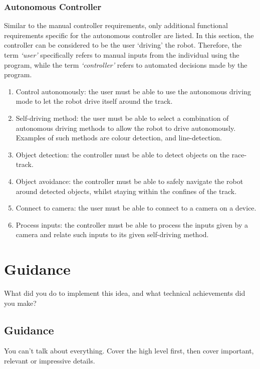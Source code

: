 \documentclass{l4proj}
\begin{document}
\subsection{Autonomous Controller}
Similar to the manual controller requirements, only additional functional requirements specific for the autonomous controller are listed. In this section, the controller can be considered to be the user ‘driving’ the robot. Therefore, the term  \textit{‘user’} specifically refers to manual inputs from the individual using the program, while the term \textit{‘controller’} refers to automated decisions made by the program.
\begin{enumerate}[label=\arabic{chapter}.\arabic*]
    \item Control autonomously: the user must be able to use the autonomous driving mode to let the robot drive itself around the track.
    \item Self-driving method: the user must be able to select a combination of autonomous driving methods to allow the robot to drive autonomously. Examples of such methods are colour detection, and line-detection.
    \item Object detection: the controller must be able to detect objects on the race-track.
    \item Object avoidance: the controller must be able to safely navigate the robot around detected objects, whilst staying within the confines of the track.
    \item Connect to camera: the user must be able to connect to a camera on a device.
    \item Process inputs: the controller must be able to process the inputs given by a camera and relate such inputs to its given self-driving method.
\end{enumerate}

\chapter{Guidance}
What did you do to implement this idea, and what technical achievements did you make?
\section{Guidance}
You can't talk about everything. Cover the high level first, then cover important, relevant or impressive details.
\end{document}
